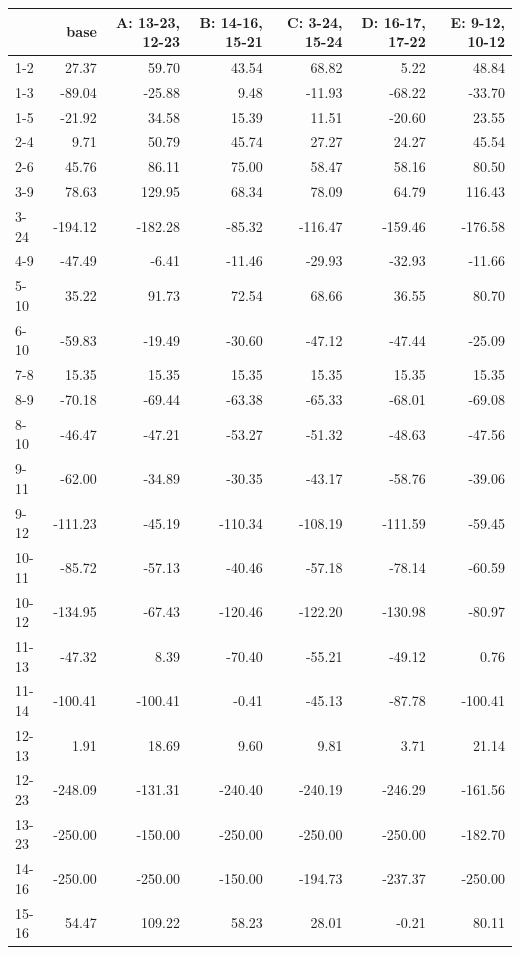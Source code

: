 \begin{tabular}{lrrrrrr}
\toprule
 & base & A: 13-23, 12-23 & B: 14-16, 15-21 & C: 3-24, 15-24 & D: 16-17, 17-22 & E: 9-12, 10-12 \\
\midrule
1-2 & 27.37 & 59.70 & 43.54 & 68.82 & 5.22 & 48.84 \\
1-3 & -89.04 & -25.88 & 9.48 & -11.93 & -68.22 & -33.70 \\
1-5 & -21.92 & 34.58 & 15.39 & 11.51 & -20.60 & 23.55 \\
2-4 & 9.71 & 50.79 & 45.74 & 27.27 & 24.27 & 45.54 \\
2-6 & 45.76 & 86.11 & 75.00 & 58.47 & 58.16 & 80.50 \\
3-9 & 78.63 & 129.95 & 68.34 & 78.09 & 64.79 & 116.43 \\
3-24 & -194.12 & -182.28 & -85.32 & -116.47 & -159.46 & -176.58 \\
4-9 & -47.49 & -6.41 & -11.46 & -29.93 & -32.93 & -11.66 \\
5-10 & 35.22 & 91.73 & 72.54 & 68.66 & 36.55 & 80.70 \\
6-10 & -59.83 & -19.49 & -30.60 & -47.12 & -47.44 & -25.09 \\
7-8 & 15.35 & 15.35 & 15.35 & 15.35 & 15.35 & 15.35 \\
8-9 & -70.18 & -69.44 & -63.38 & -65.33 & -68.01 & -69.08 \\
8-10 & -46.47 & -47.21 & -53.27 & -51.32 & -48.63 & -47.56 \\
9-11 & -62.00 & -34.89 & -30.35 & -43.17 & -58.76 & -39.06 \\
9-12 & -111.23 & -45.19 & -110.34 & -108.19 & -111.59 & -59.45 \\
10-11 & -85.72 & -57.13 & -40.46 & -57.18 & -78.14 & -60.59 \\
10-12 & -134.95 & -67.43 & -120.46 & -122.20 & -130.98 & -80.97 \\
11-13 & -47.32 & 8.39 & -70.40 & -55.21 & -49.12 & 0.76 \\
11-14 & -100.41 & -100.41 & -0.41 & -45.13 & -87.78 & -100.41 \\
12-13 & 1.91 & 18.69 & 9.60 & 9.81 & 3.71 & 21.14 \\
12-23 & -248.09 & -131.31 & -240.40 & -240.19 & -246.29 & -161.56 \\
13-23 & -250.00 & -150.00 & -250.00 & -250.00 & -250.00 & -182.70 \\
14-16 & -250.00 & -250.00 & -150.00 & -194.73 & -237.37 & -250.00 \\
15-16 & 54.47 & 109.22 & 58.23 & 28.01 & -0.21 & 80.11 \\

\end{tabular}
